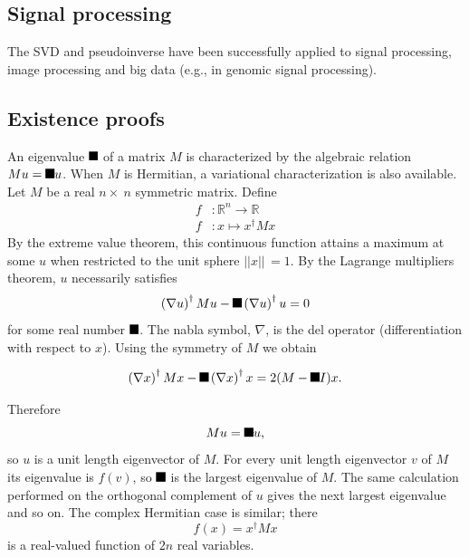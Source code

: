 \documentclass[aps,preprint]{revtex4}%
\providecommand{\U}[1]{\protect\rule{.1in}{.1in}}
\begin{document}
\subsection{Signal processing}

The SVD and pseudoinverse have been successfully applied to signal processing,
image processing and big data (e.g., in genomic signal processing).

\subsection{Existence proofs}

An eigenvalue $\U{3bb} $ of a matrix $M$ is characterized by the algebraic
relation $Mu=\U{3bb} u$. When $M$ is Hermitian, a variational characterization
is also available. Let $M$ be a real $n\times\ n$ symmetric matrix. Define%
\begin{align}
f  &  :\mathbb{R}^{n}\rightarrow\mathbb{R}\\
f  &  :x\mapsto x^{\dagger}Mx
\end{align}
By the extreme value theorem, this continuous function attains a maximum at
some $u$ when restricted to the unit sphere $||x||\,=1$. By the Lagrange
multipliers theorem, $u$ necessarily satisfies%
\begin{equation}
\left(  \nabla u\right)  ^{\dagger}Mu-\U{3bb} \left(  \nabla u\right)
^{\dagger}u=0
\end{equation}
for some real number $\U{3bb} $. The nabla symbol, $\nabla$, is the del
operator (differentiation with respect to $x$). Using the symmetry of $M$ we obtain%

\begin{equation}
\left(  \nabla x\right)  ^{\dagger}Mx-\U{3bb} \left(  \nabla x\right)
^{\dagger}x=2(M-\U{3bb} I)x.
\end{equation}


Therefore
\begin{equation}
Mu=\U{3bb} u,
\end{equation}
so $u$ is a unit length eigenvector of $M$. For every unit length eigenvector
$v$ of $M$ its eigenvalue is $f(v)$, so $\U{3bb} $ is the largest eigenvalue
of $M$. The same calculation performed on the orthogonal complement of $u$
gives the next largest eigenvalue and so on. The complex Hermitian case is
similar; there
\begin{equation}
f(x)=x^{\dagger}Mx
\end{equation}
is a real-valued function of $2n$ real variables.
\end{document}
